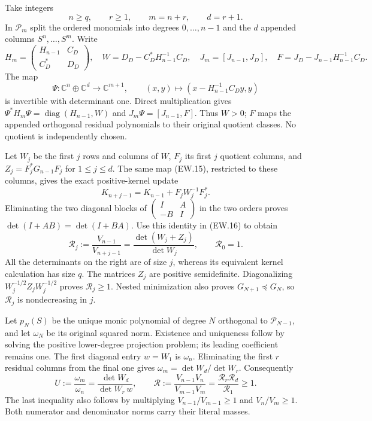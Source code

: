 \documentclass[11pt]{article}
\newcommand{\C}{\mathbb C}
\newcommand{\diag}{\operatorname{diag}}
\begin{document}
Take integers
\[
 n\ge q,\qquad r\ge1,\qquad m=n+r,\qquad d=r+1.
                                                               \tag{EW.13}
\]
In $\mathcal P_m$ split the ordered monomials into degrees
$0,\ldots,n-1$ and the $d$ appended columns $S^n,\ldots,S^m$.
Write
\[
 H_m=\begin{pmatrix}H_{n-1}&C_D\\C_D^*&D_D\end{pmatrix},\quad
 W=D_D-C_D^*H_{n-1}^{-1}C_D,\quad
 J_m=[J_{n-1},J_D],\quad F=J_D-J_{n-1}H_{n-1}^{-1}C_D.
                                                               \tag{EW.14}
\]
The map
\[
 \Psi:\C^n\oplus\C^d\longrightarrow\C^{m+1},\qquad
 (x,y)\longmapsto(x-H_{n-1}^{-1}C_Dy,y)                     \tag{EW.15}
\]
is invertible with determinant one. Direct multiplication gives
$\Psi^*H_m\Psi=\diag(H_{n-1},W)$ and
$J_m\Psi=[J_{n-1},F]$. Thus $W>0$; $F$ maps the appended
orthogonal residual polynomials to their original quotient classes.
No quotient is independently chosen.

Let $W_j$ be the first $j$ rows and columns of $W$, $F_j$ its
first $j$ quotient columns, and $Z_j=F_j^*G_{n-1}F_j$ for
$1\le j\le d$. The same map (EW.15), restricted to these columns,
gives the exact positive-kernel update
\[
 K_{n+j-1}=K_{n-1}+F_jW_j^{-1}F_j^*.                         \tag{EW.16}
\]
Eliminating the two diagonal blocks of
$\left(\begin{smallmatrix}I&A\\-B&I\end{smallmatrix}\right)$
in the two orders proves $\det(I+AB)=\det(I+BA)$.
Use this identity in (EW.16) to obtain
\[
 \boxed{\mathscr R_j:=\frac{V_{n-1}}{V_{n+j-1}}
     =\frac{\det(W_j+Z_j)}{\det W_j},\qquad \mathscr R_0=1.}
                                                               \tag{EW.17}
\]
All the determinants on the right are of size $j$, whereas its
equivalent kernel calculation has size $q$. The matrices $Z_j$
are positive semidefinite. Diagonalizing
$W_j^{-1/2}Z_jW_j^{-1/2}$ proves $\mathscr R_j\ge1$.
Nested minimization also proves $G_{N+1}\preceq G_N$, so
$\mathscr R_j$ is nondecreasing in $j$.

Let $p_N(S)$ be the unique monic polynomial of degree $N$
orthogonal to $\mathcal P_{N-1}$, and let $\omega_N$ be its
original squared norm. Existence and uniqueness follow by solving the
positive lower-degree projection problem; its leading coefficient
remains one. The first diagonal entry $w=W_1$ is $\omega_n$.
Eliminating the first $r$ residual columns from the final one gives
$\omega_m=\det W_d/\det W_r$. Consequently
\[
 \boxed{U:=\frac{\omega_m}{\omega_n}
    =\frac{\det W_d}{\det W_r\,w},\qquad
 \mathscr R:=\frac{V_{n-1}V_n}{V_{m-1}V_m}
    =\frac{\mathscr R_r\mathscr R_d}{\mathscr R_1}\ge1.}
                                                               \tag{EW.18}
\]
The last inequality also follows by multiplying
$V_{n-1}/V_{m-1}\ge1$ and $V_n/V_m\ge1$. Both numerator
and denominator norms carry their literal masses.
\end{document}
